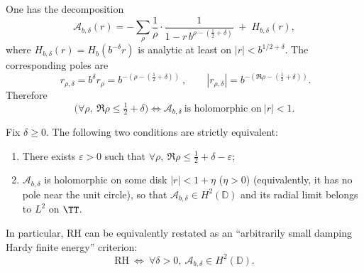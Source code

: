 \begin{proposition}\label{prop:damped-poles}
One has the decomposition
\[
\mathcal A_{b,\delta}(r)
=-\sum_{\rho}\frac{1}{\rho}\cdot\frac{1}{1-r\,b^{\rho-(\frac12+\delta)}}\;+\;H_{b,\delta}(r),
\]
where \(H_{b,\delta}(r)=H_b(b^{-\delta}r)\) is analytic at least on \(|r|<b^{1/2+\delta}\). The corresponding poles are
\[
\boxed{\ r_{\rho,\delta}=b^{\delta}r_\rho=b^{-(\rho-(\frac12+\delta))}\ },\qquad
|r_{\rho,\delta}|=b^{-(\Re\rho-(\frac12+\delta))}.
\]
Therefore
\[
\bigl(\forall\rho,\ \Re\rho\le\tfrac12+\delta\bigr)
\Longleftrightarrow
\mathcal A_{b,\delta}\ \text{is holomorphic on}\ |r|<1.
\]
\end{proposition}

\begin{theorem}\label{thm:hardy-criterion-delta}
Fix \(\delta\ge 0\). The following two conditions are strictly equivalent:
\begin{enumerate}
\item There exists \(\varepsilon>0\) such that \(\forall\rho,\ \Re\rho\le \tfrac12+\delta-\varepsilon\);
\item \(\mathcal A_{b,\delta}\) is holomorphic on some disk \(|r|<1+\eta\) (\(\eta>0\)) (equivalently, it has no pole near the unit circle), so that \(\mathcal A_{b,\delta}\in H^2(\mathbb D)\) and its radial limit belongs to \(L^2\) on \(\TT\).
\end{enumerate}
In particular, RH can be equivalently restated as an ``arbitrarily small damping Hardy finite energy'' criterion:
\[
\boxed{\ \mathrm{RH}\ \Longleftrightarrow\ \forall\delta>0,\ \mathcal A_{b,\delta}\in H^2(\mathbb D).\ }
\]
\end{theorem}
